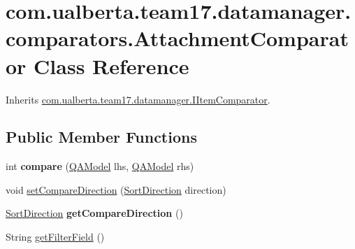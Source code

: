 \hypertarget{classcom_1_1ualberta_1_1team17_1_1datamanager_1_1comparators_1_1_attachment_comparator}{\section{com.\+ualberta.\+team17.\+datamanager.\+comparators.\+Attachment\+Comparator Class Reference}
\label{classcom_1_1ualberta_1_1team17_1_1datamanager_1_1comparators_1_1_attachment_comparator}
}


Inherits \hyperlink{interfacecom_1_1ualberta_1_1team17_1_1datamanager_1_1_i_item_comparator}{com.\+ualberta.\+team17.\+datamanager.\+I\+Item\+Comparator}.

\subsection*{Public Member Functions}
\begin{DoxyCompactItemize}
\item 
\hypertarget{classcom_1_1ualberta_1_1team17_1_1datamanager_1_1comparators_1_1_attachment_comparator_a973562d69f872d8326ef36020f2c7c70}{int {\bfseries compare} (\hyperlink{classcom_1_1ualberta_1_1team17_1_1_q_a_model}{Q\+A\+Model} lhs, \hyperlink{classcom_1_1ualberta_1_1team17_1_1_q_a_model}{Q\+A\+Model} rhs)}\label{classcom_1_1ualberta_1_1team17_1_1datamanager_1_1comparators_1_1_attachment_comparator_a973562d69f872d8326ef36020f2c7c70}

\item 
void \hyperlink{classcom_1_1ualberta_1_1team17_1_1datamanager_1_1comparators_1_1_attachment_comparator_ade646a37c9740c7c778f2e3369128649}{set\+Compare\+Direction} (\hyperlink{enumcom_1_1ualberta_1_1team17_1_1datamanager_1_1_i_item_comparator_1_1_sort_direction}{Sort\+Direction} direction)
\item 
\hypertarget{classcom_1_1ualberta_1_1team17_1_1datamanager_1_1comparators_1_1_attachment_comparator_ab1104a50cce13ed1bec7bbaad8d452c7}{\hyperlink{enumcom_1_1ualberta_1_1team17_1_1datamanager_1_1_i_item_comparator_1_1_sort_direction}{Sort\+Direction} {\bfseries get\+Compare\+Direction} ()}\label{classcom_1_1ualberta_1_1team17_1_1datamanager_1_1comparators_1_1_attachment_comparator_ab1104a50cce13ed1bec7bbaad8d452c7}

\item 
String \hyperlink{classcom_1_1ualberta_1_1team17_1_1datamanager_1_1comparators_1_1_attachment_comparator_ab4ad6032b2f883180b82beb68231cb3d}{get\+Filter\+Field} ()
\end{DoxyCompactItemize}


